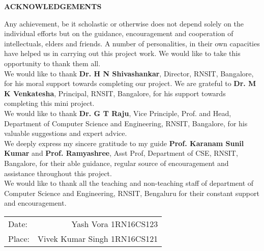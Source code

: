 \thispagestyle{empty}
\begin{center}
\textup{\large{\textbf{ACKNOWLEDGEMENTS}}} \\[0.1in]
\end{center}

\justify
\indent
Any achievement, be it scholastic or otherwise does not depend solely on the individual efforts but on the guidance, encouragement and cooperation of intellectuals, elders and friends. A number of personalities, in their own capacities have helped us in carrying out this project work. We would like to take this opportunity to thank them all. \\

We would like to thank \textbf{Dr. H N Shivashankar}, Director, RNSIT, Bangalore, for his moral support towards completing our project.
We are grateful to \textbf{Dr. M K Venkatesha}, Principal, RNSIT, Bangalore, for his support towards completing this mini project. \\

We would like to thank \textbf{Dr. G T Raju}, Vice Principle, Prof. and Head, Department of Computer Science and Engineering, RNSIT, Bangalore, for his valuable suggestions and expert advice. \\

We deeply express my sincere gratitude to my guide \textbf{Prof. Karanam Sunil Kumar} and \textbf{Prof. Ramyashree}, Asst Prof, Department of CSE, RNSIT, Bangalore, for their able guidance, regular source of encouragement and assistance throughout this project. \\

We would like to thank all the teaching and non-teaching staff of department of Computer Science and Engineering, RNSIT, Bengaluru for their constant support and encouragement.\\[3.3in]
\justify
\begin{tabular}{l r}
\textup{Date:} & \hspace{9cm}\textup{Yash Vora 1RN16CS123}\\
\textup{Place:} & \hspace{9cm}\textup{Vivek Kumar Singh 1RN16CS121}
\end{tabular}


\pagebreak